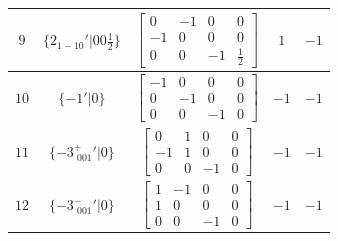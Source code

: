 \documentclass[fleqn,8pt]{jsarticle}
\begin{document}
\begin{longtable}{ccccc}
$ 9 $ & $ \{2{}_{1-10}{}'|0 0 \frac{1}{2}\} $ & $ \begin{bmatrix} 0 & -1 & 0 & 0 \\ -1 & 0 & 0 & 0 \\ 0 & 0 & -1 & \frac{1}{2} \end{bmatrix} $ & $ 1 $ & $ -1 $ \\ \hline
$ 10 $ & $ \{-1{}'|0\} $ & $ \begin{bmatrix} -1 & 0 & 0 & 0 \\ 0 & -1 & 0 & 0 \\ 0 & 0 & -1 & 0 \end{bmatrix} $ & $ -1 $ & $ -1 $ \\ \hline
$ 11 $ & $ \{-3^{+}_{\,\,001}{}'|0\} $ & $ \begin{bmatrix} 0 & 1 & 0 & 0 \\ -1 & 1 & 0 & 0 \\ 0 & 0 & -1 & 0 \end{bmatrix} $ & $ -1 $ & $ -1 $ \\ \hline
$ 12 $ & $ \{-3^{-}_{\,\,001}{}'|0\} $ & $ \begin{bmatrix} 1 & -1 & 0 & 0 \\ 1 & 0 & 0 & 0 \\ 0 & 0 & -1 & 0 \end{bmatrix} $ & $ -1 $ & $ -1 $ \\
\end{longtable}
\end{document}
